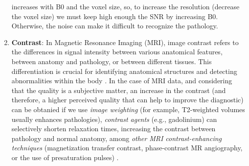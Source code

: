 \begin{enumerate}
{    increases with B0 and the voxel size, so, to increase the
    resolution (decrease the voxel size) we must keep high enough the
    SNR by increasing B0. Otherwise, the noise can make it difficult
    to recognize the pathology}.
\item \textbf{Contrast}: In Magnetic Resonance Imaging (MRI),
    image contrast refers to the differences in signal intensity
    between various anatomical features, between anatomy and
    pathology, or between different tissues. This differentiation is
    crucial for identifying anatomical structures and detecting
    abnormalities within the body \cite{westbrook2018mri}. In the case of MRI data, and considering that the quality
  is a subjective matter, an increase in the contrast (and therefore,
  a higher perceived quality that can help to improve the diagnostic)
  can be obtanied if we use \emph{image weighting} (for example,
  T2-weighted volumes usually enhances pathologies), \emph{contrast agents}
  (e.g., gadolinium) can selectively shorten relaxation times,
  increasing the contrast between pathology and normal anatomy, among
  \emph{other MRI contrast-enhancing techniques} (magnetization
  transfer contrast, phase-contrast MR angiography, or the use of
  presaturation pulses) \cite{westbrook2018mri}.
\end{enumerate}
